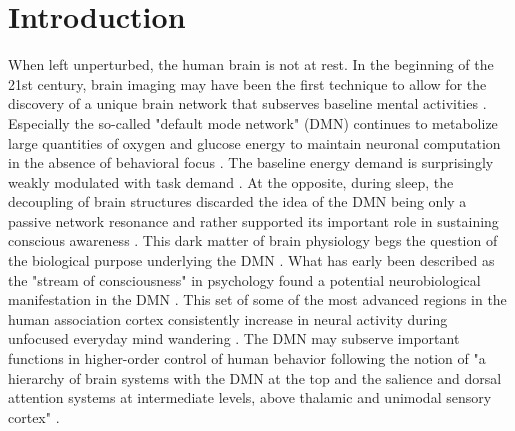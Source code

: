 \documentclass[10pt,letterpaper]{article}
\begin{document}

\section{Introduction}
%
When left unperturbed, the human brain is not at rest.
In the beginning of the 21st century,
brain imaging may have been the first technique
to allow for the discovery of a unique brain network that subserves
baseline mental activities
\citep{raichle2001pnas, bzdok2015resting}.
Especially the so-called "default mode network" (DMN) continues
to metabolize large quantities of
oxygen and glucose energy to maintain
neuronal computation
in the absence of behavioral focus
\citep{kenet2003spontaneously, fiser2004small}.
The baseline energy demand is surprisingly weakly modulated
with task demand \citep{raichle2001pnas}. At the opposite, during sleep, the
decoupling of brain structures discarded the idea of the DMN being
only a passive network resonance and rather supported its
important role in sustaining conscious awareness \citep{horovitz2009decoupling}.
This dark matter of brain physiology begs the question
of the biological purpose underlying the DMN
\citep{raichle2006brain}.
What has early been described as the "stream of consciousness"
in psychology \citep{james1890principles}
found a potential neurobiological manifestation
in the DMN
\citep{shul1997, raichle2001pnas}.
This set of some of the most advanced regions in
the human association cortex \citep{mesulam1998sensation, margulies2016situating}
consistently
increase in neural activity during
unfocused everyday mind wandering \citep{raichle2001pnas}.
The DMN may subserve important functions in
higher-order control of human behavior
following the notion of "a hierarchy of brain systems with
the DMN at the top and the salience and dorsal attention systems
at intermediate levels, above thalamic and unimodal sensory
cortex" \citep{carhart2010default}.
\end{document}

